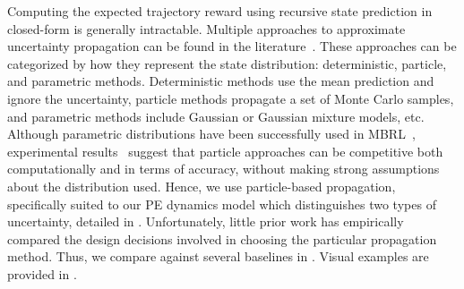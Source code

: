 Computing the expected trajectory reward using recursive state prediction in closed-form is generally intractable. 
Multiple approaches to approximate uncertainty propagation can be found in the literature~\citep{Girard2002,Quinonero-Candela2003}.
	These approaches can be categorized by how they represent the state distribution: deterministic, particle, and parametric methods. 
	Deterministic methods use the mean prediction and ignore the uncertainty, particle methods propagate a set of Monte Carlo samples, and parametric methods include Gaussian or Gaussian mixture models, etc.
	Although parametric distributions have been successfully used in MBRL~\citep{Deisenroth2014}, experimental results~\citep{Kupcsik2013} suggest that particle approaches can be competitive both computationally and in terms of accuracy, without making strong assumptions about the distribution used.
Hence, we use particle-based propagation, specifically suited to our PE dynamics model which distinguishes two types of uncertainty, detailed in .
Unfortunately, little prior work has empirically compared the design decisions involved in choosing the particular propagation method. 
Thus, we compare against several baselines in .
Visual examples are provided in .

